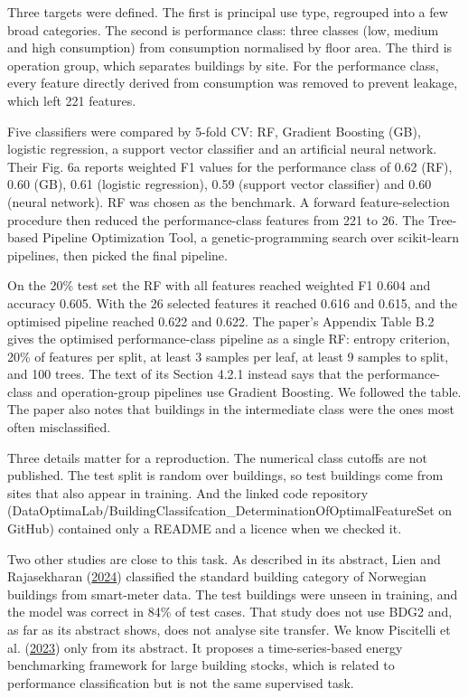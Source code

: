 \documentclass[
  10pt,
]{article}
\begin{document}
Three targets were defined. The first is principal use type, regrouped
into a few broad categories. The second is performance class: three
classes (low, medium and high consumption) from consumption normalised
by floor area. The third is operation group, which separates buildings
by site. For the performance class, every feature directly derived from
consumption was removed to prevent leakage, which left 221 features.

Five classifiers were compared by 5-fold CV: RF, Gradient Boosting (GB),
logistic regression, a support vector classifier and an artificial
neural network. Their Fig. 6a reports weighted F1 values for the
performance class of 0.62 (RF), 0.60 (GB), 0.61 (logistic regression),
0.59 (support vector classifier) and 0.60 (neural network). RF was
chosen as the benchmark. A forward feature-selection procedure then
reduced the performance-class features from 221 to 26. The Tree-based
Pipeline Optimization Tool, a genetic-programming search over
scikit-learn pipelines, then picked the final pipeline.

On the 20\% test set the RF with all features reached weighted F1 0.604
and accuracy 0.605. With the 26 selected features it reached 0.616 and
0.615, and the optimised pipeline reached 0.622 and 0.622. The paper's
Appendix Table B.2 gives the optimised performance-class pipeline as a
single RF: entropy criterion, 20\% of features per split, at least 3
samples per leaf, at least 9 samples to split, and 100 trees. The text
of its Section 4.2.1 instead says that the performance-class and
operation-group pipelines use Gradient Boosting. We followed the table.
The paper also notes that buildings in the intermediate class were the
ones most often misclassified.

Three details matter for a reproduction. The numerical class cutoffs are
not published. The test split is random over buildings, so test
buildings come from sites that also appear in training. And the linked
code repository
(DataOptimaLab/BuildingClassifcation\_DeterminationOfOptimalFeatureSet
on GitHub) contained only a README and a licence when we checked it.

Two other studies are close to this task. As described in its abstract,
Lien and Rajasekharan (\protect\hyperlink{ref-lien2024}{2024})
classified the standard building category of Norwegian buildings from
smart-meter data. The test buildings were unseen in training, and the
model was correct in 84\% of test cases. That study does not use BDG2
and, as far as its abstract shows, does not analyse site transfer. We
know Piscitelli et al. (\protect\hyperlink{ref-piscitelli2023}{2023})
only from its abstract. It proposes a time-series-based energy
benchmarking framework for large building stocks, which is related to
performance classification but is not the same supervised task.
\end{document}
